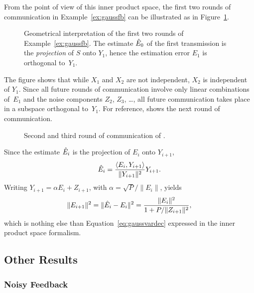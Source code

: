 From the point of view of this inner product space, the first two rounds of
communication in Example~\ref{ex:gaussfb} can be illustrated as in
Figure~\ref{fig:gaussfb1}.
\begin{figure}[tbph]
  \begin{center}
  \end{center}
  \caption{Geometrical interpretation of the first two rounds of
  Example~\ref{ex:gaussfb}. The estimate $\hat{E}_0$ of the first transmission is
  the \emph{projection} of $S$ onto $Y_1$, hence the estimation error $E_1$ is
  orthogonal to~$Y_1$.}
  \label{fig:gaussfb1}
\end{figure}
The figure shows that while $X_1$ and $X_2$ are not independent, $X_2$ is
independent of $Y_1$. Since all future rounds of communication involve only
linear combinations of~$E_1$ and the noise components $Z_2$, $Z_3$, \dots, all
future communication takes place in a subspace orthogonal to~$Y_1$. For
reference,  shows the next round of communication.
\begin{figure}[tbph]
  \begin{center}
  \end{center}
  \caption{Second and third round of communication of .}
  \label{fig:gaussfb2}
\end{figure}

Since the estimate $\hat{E}_i$ is the projection of $E_i$ onto $Y_{i+1}$, 
\begin{equation*}
  \hat{E}_i = \frac{\langle E_i, Y_{i+1} \rangle}{\|Y_{i+1}\|^2} Y_{i+1}.
\end{equation*}
Writing $Y_{i+1} = \alpha E_i + Z_{i+1}$, with $\alpha = \sqrt{P}/\|E_i\|$,
yields
\begin{equation*}
  \|E_{i+1}\|^2 = \|\hat{E}_i - E_i\|^2 = \frac{\|E_i\|^2}{1 + P/\|Z_{i+1}\|^2},
\end{equation*}
which is nothing else than Equation~\ref{eq:gaussvardec} expressed in the inner
product space formalism.



\subsection{Other Results}

\subsubsection{Noisy Feedback}

